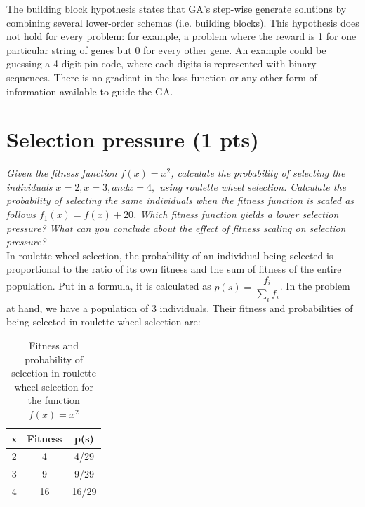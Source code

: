 \documentclass{article}
\begin{document}
The building block hypothesis states that GA's step-wise generate solutions by combining several lower-order schemas (i.e. building blocks). This hypothesis does not hold for every problem: for example, a problem where the reward is 1 for one particular string of genes but 0 for every other gene. An example could be guessing a 4 digit pin-code, where each digits is represented with binary sequences. There is no gradient in the loss function or any other form of information available to guide the GA.

\section{Selection pressure (1 pts)}
\textit{Given the fitness function $f(x) = x^2$, calculate the probability of selecting the individuals $x = 2, x = 3, and x = 4,$ using roulette wheel selection. Calculate the probability of selecting the same individuals when the fitness function is scaled as follows $f_1 (x) = f (x) + 20$. Which fitness function yields a lower selection pressure? What can you conclude about the effect of fitness scaling on selection pressure?} \\ 

In roulette wheel selection, the probability of an individual being selected is proportional to the ratio of its own fitness and the sum of fitness of the entire population. Put in a formula, it is calculated as $p(s) = \dfrac{f_i}{\sum_i f_i}$. In the problem at hand, we have a population of 3 individuals. Their fitness and probabilities of being selected in roulette wheel selection are: \\
\begin{table}[]
    \centering
    \begin{tabular}{c|c|c}
    x    & Fitness  & p(s) \\ \hline \hline
    2    &  4       & 4/29 \\ \hline
    3    &  9       & 9/29 \\ \hline
    4    &  16      & 16/29 \\    
    \end{tabular}
    \caption{Fitness and probability of selection in roulette wheel selection for the function $f(x)=x^2$}
\end{table}
\end{document}
